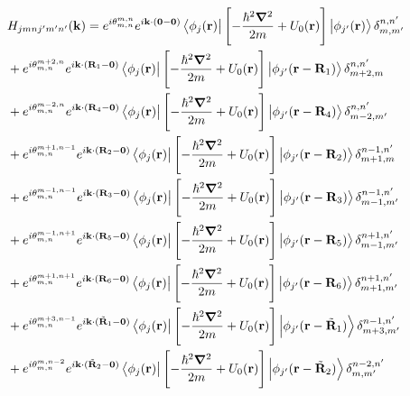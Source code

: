 \documentclass{report}
\newcommand{\f}[2]{\dfrac{#1}{#2}}
\begin{document}
\begin{equation}
	\begin{aligned}
		 & H_{jmnj'm'n'}(\mathbf{k})
		= e^{i\theta_{m,n}^{m,n}}e^{i\mathbf{k} \cdot (\mathbf{0} - \mathbf{0})} \bra{\phi_{j}(\mathbf{r})} \left[-\f{\hbar^{2} \boldsymbol{\nabla}^{2}}{2m} + U_{0}(\mathbf{r})\right] \ket{\phi_{j'}(\mathbf{r})}\delta_{m,m'}^{n,n'}                              \\
		 & + e^{i\theta_{m,n}^{m+2,n}}e^{i\mathbf{k} \cdot (\mathbf{R}_{1} - \mathbf{0})} \bra{\phi_{j}(\mathbf{r})} \left[-\f{\hbar^{2} \boldsymbol{\nabla}^{2}}{2m} + U_{0}(\mathbf{r})\right] \ket{\phi_{j'}(\mathbf{r}-\mathbf{R}_{1})}\delta_{m+2,m}^{n,n'}     \\
		 & + e^{i\theta_{m,n}^{m-2,n}}e^{i\mathbf{k} \cdot (\mathbf{R}_{4} - \mathbf{0})} \bra{\phi_{j}(\mathbf{r})} \left[-\f{\hbar^{2} \boldsymbol{\nabla}^{2}}{2m} + U_{0}(\mathbf{r})\right] \ket{\phi_{j'}(\mathbf{r}-\mathbf{R}_{4})}\delta_{m-2,m'}^{n,n'}    \\
		 & + e^{i\theta_{m,n}^{m+1,n-1}}e^{i\mathbf{k} \cdot (\mathbf{R}_{2} - \mathbf{0})} \bra{\phi_{j}(\mathbf{r})} \left[-\f{\hbar^{2} \boldsymbol{\nabla}^{2}}{2m} + U_{0}(\mathbf{r})\right] \ket{\phi_{j'}(\mathbf{r}-\mathbf{R}_{2})}\delta_{m+1,m}^{n-1,n'} \\
		 & + e^{i\theta_{m,n}^{m-1,n-1}}e^{i\mathbf{k} \cdot (\mathbf{R}_{3}-\mathbf{0})} \bra{\phi_{j}(\mathbf{r})} \left[-\f{\hbar^{2} \boldsymbol{\nabla}^{2}}{2m} + U_{0}(\mathbf{r})\right] \ket{\phi_{j'}(\mathbf{r}-\mathbf{R}_{3})}\delta_{m-1,m'}^{n-1,n'}  \\
		 & + e^{i\theta_{m,n}^{m-1,n+1}}e^{i\mathbf{k} \cdot (\mathbf{R}_{5}-\mathbf{0})} \bra{\phi_{j}(\mathbf{r})} \left[-\f{\hbar^{2} \boldsymbol{\nabla}^{2}}{2m} + U_{0}(\mathbf{r})\right] \ket{\phi_{j'}(\mathbf{r}-\mathbf{R}_{5})}\delta_{m-1,m'}^{n+1,n'}  \\
		 & + e^{i\theta_{m,n}^{m+1,n+1}}e^{i\mathbf{k} \cdot (\mathbf{R}_{6}-\mathbf{0})} \bra{\phi_{j}(\mathbf{r})} \left[-\f{\hbar^{2} \boldsymbol{\nabla}^{2}}{2m} + U_{0}(\mathbf{r})\right] \ket{\phi_{j'}(\mathbf{r}-\mathbf{R}_{6})}\delta_{m+1,m'}^{n+1,n'} \\
		 & + e^{i\theta_{m,n}^{m+3,n-1}}e^{i\mathbf{k} \cdot (\tilde{\mathbf{R}}_{1}-\mathbf{0})} \bra{\phi_{j}(\mathbf{r})} \left[-\f{\hbar^{2} \boldsymbol{\nabla}^{2}}{2m} + U_{0}(\mathbf{r})\right] \ket{\phi_{j'}(\mathbf{r}-\tilde{\mathbf{R}}_{1})}\delta_{m+3,m'}^{n-1,n'} \\
		 & + e^{i\theta_{m,n}^{m,n-2}}e^{i\mathbf{k} \cdot (\tilde{\mathbf{R}}_{2}-\mathbf{0})} \bra{\phi_{j}(\mathbf{r})} \left[-\f{\hbar^{2} \boldsymbol{\nabla}^{2}}{2m} + U_{0}(\mathbf{r})\right] \ket{\phi_{j'}(\mathbf{r}-\tilde{\mathbf{R}}_{2})}\delta_{m,m'}^{n-2,n'} \\

\end{aligned}
\end{equation}
\end{document}
